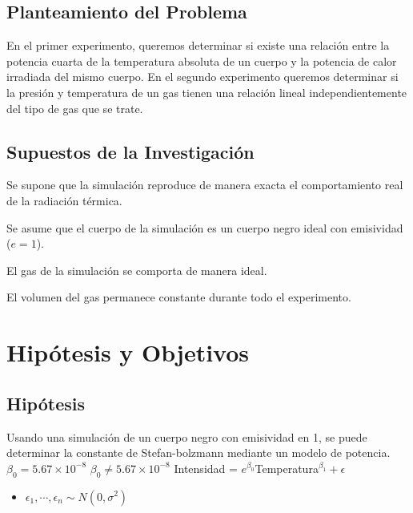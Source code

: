 \documentclass[12pt,a4paper]{config/myConfig}
\begin{document}
\subsection{Planteamiento del Problema}
\label{sec:PLANTAMIENTO-PROBLEMA}

En el primer experimento, queremos determinar si existe una relación entre la potencia cuarta de la temperatura absoluta de un cuerpo y la potencia de calor irradiada del mismo cuerpo. En el segundo experimento queremos determinar si la presión y temperatura de un gas tienen una relación lineal independientemente del tipo de gas que se trate. 

\subsection{Supuestos de la Investigación}
\label{sec:SUPUESTOS}

\begin{supuestos}
  \item \label{su:uno} Se supone que la simulación reproduce de manera exacta el comportamiento real de la radiación térmica. 
  \item \label{su:dos} Se asume que el cuerpo de la simulación es un cuerpo negro ideal con emisividad ($e = 1$).
  \item \label{su:tres} El gas de la simulación se comporta de manera ideal. 
  \item \label{su:cuatro} El volumen del gas permanece constante durante todo el experimento.
\end{supuestos}

\section{Hipótesis y Objetivos}
\label{sec:HIPOTESIS-OBJECTIVOS}

\subsection{Hipótesis}
\label{sec:HIPOTESIS}


\begin{hipotesis}
  {Usando una simulación de un cuerpo negro con emisividad en 1, se puede determinar la constante de Stefan-bolzmann mediante un modelo de potencia.}
  {$\beta_0 = 5.67 \times 10^{-8}$} %
  {$\beta_0 \neq 5.67 \times 10^{-8}$}    %
  {Intensidad = $e^{\beta_0}$Temperatura$^{\beta_1}  + \epsilon$} %
  {\begin{itemize}
      \item $\epsilon_1,\cdots, \epsilon_n \sim N(0,\sigma^2)$
    \end{itemize}}
\end{hipotesis}
\end{document}
